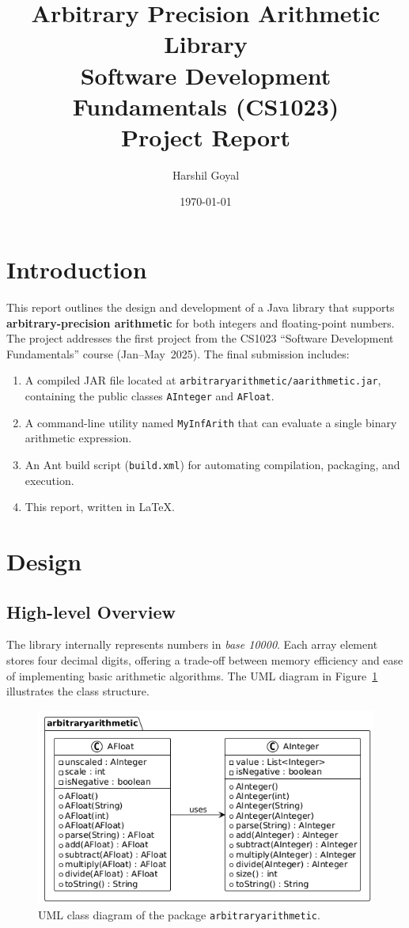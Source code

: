 \documentclass[12pt]{article}
\title{Arbitrary Precision Arithmetic Library\\Software Development Fundamentals (CS1023)\\\vspace{0.5em}Project Report}
\author{Harshil Goyal}
\date{\today}
\begin{document}
\maketitle
\tableofcontents
\newpage

\section{Introduction}
This report outlines the design and development of a Java library that supports \textbf{arbitrary-precision arithmetic} for both integers and floating-point numbers. The project addresses the first project from the CS1023 “Software Development Fundamentals” course (Jan–May~2025). The final submission includes:

\begin{enumerate}[label=\arabic*.]
  \item A compiled JAR file located at \texttt{arbitraryarithmetic/aarithmetic.jar}, containing the public classes \texttt{AInteger} and \texttt{AFloat}.
  \item A command-line utility named \texttt{MyInfArith} that can evaluate a single binary arithmetic expression.
  \item An Ant build script (\texttt{build.xml}) for automating compilation, packaging, and execution.
  \item This report, written in \LaTeX.
\end{enumerate}

\section{Design}
\subsection{High-level Overview}
The library internally represents numbers in \emph{base 10000}. Each array element stores four decimal digits, offering a trade-off between memory efficiency and ease of implementing basic arithmetic algorithms. The UML diagram in Figure~\ref{fig:uml} illustrates the class structure.

\begin{figure}[h]
  \centering
  \includegraphics[width=0.9\linewidth]{uml_sdf1.png}
  \caption{UML class diagram of the package \texttt{arbitraryarithmetic}.}
  \label{fig:uml}
\end{figure}
\end{document}
